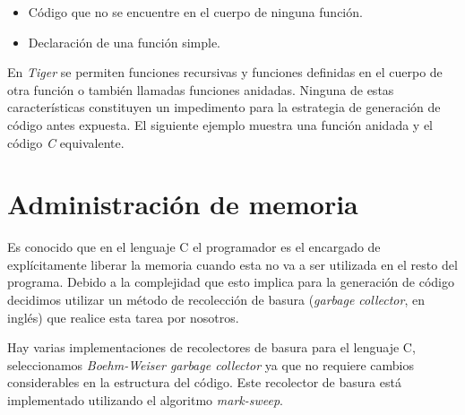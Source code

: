 \documentclass{article}
\begin{document}
\begin{itemize}
  \item Código que no se encuentre en el cuerpo de ninguna función.

    \begin{quote}
    
    \end{quote}

    \begin{quote}
    
    \end{quote}

  \item Declaración de una función simple.

    \begin{quote}
    
    \end{quote}

    \begin{quote}
    
    \end{quote}
\end{itemize}

En \textit{Tiger} se permiten funciones recursivas y funciones definidas en el
cuerpo de otra función o también llamadas funciones anidadas. Ninguna de estas
características constituyen un impedimento para la estrategia de generación de
código antes expuesta. El siguiente ejemplo muestra una función anidada y el
código \textit{C} equivalente.

\begin{quote}

\end{quote}

\begin{quote}

\end{quote}

\section{Administración de memoria}

Es conocido que en el lenguaje C el programador es el encargado de explícitamente
liberar la memoria cuando esta no va a ser utilizada en el resto del programa.
Debido a la complejidad que esto implica para la generación de código decidimos
utilizar un método de recolección de basura (\emph{garbage collector}, en inglés)
que realice esta tarea por nosotros.

Hay varias implementaciones de recolectores de basura para el lenguaje C,
seleccionamos \emph{Boehm-Weiser garbage collector} ya que no requiere cambios
considerables en la estructura del código. Este recolector de basura está
implementado utilizando el algoritmo \emph{mark-sweep}.
\end{document}
